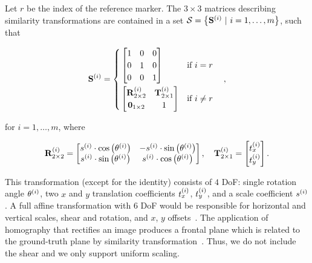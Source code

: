 Let $r$ be the index of the reference marker. The $3 \times 3$ matrices describing similarity transformations are contained in a set $\mathcal{S} = \left\{ {{\mathbf{S}}^{\left( {i} \right)} \ |\ i = 1, \dots, m} \right\}$, such that

\begin{equation}
    \label{eq:SimilarityMatrices}
    {\mathbf{S}}^{\left( {i} \right)} =
    \begin{cases}
        \begin{aligned}
             & \begin{bmatrix}
                1 & 0 & 0 \\
                0 & 1 & 0 \\
                0 & 0 & 1
            \end{bmatrix} & \text{if } i = r   \\
             & \begin{bmatrix}
                {\mathbf{R}}_{2 \times 2}^{\left( {i} \right)} & {\mathbf{T}}_{2 \times 1}^{\left( {i} \right)} \\
                \mathbf{0}_{1 \times 2}                  & 1
            \end{bmatrix} & \text{if }i \neq r \\
        \end{aligned}
    \end{cases},
\end{equation}

\noindent for $i = 1, \dots, m$, where

\begin{equation}
    {\mathbf{R}}_{2 \times 2}^{\left( {i} \right)} =
    \begin{bmatrix}
        {s}^{\left( {i} \right)} \cdot {\cos} \left( {\theta}^{\left( {i} \right)} \right) & -{s}^{\left( {i} \right)} \cdot {\sin} \left( {\theta}^{\left( {i} \right)} \right) \\
        {s}^{\left( {i} \right)} \cdot {\sin} \left( {\theta}^{\left( {i} \right)} \right) & {s}^{\left( {i} \right)} \cdot {\cos} \left( {\theta}^{\left( {i} \right)} \right)
    \end{bmatrix}, \quad
    {\mathbf{T}}_{2 \times 1}^{\left( {i} \right)} =
    \begin{bmatrix}
        {t}_{x}^{\left( {i} \right)} \\
        {t}_{y}^{\left( {i} \right)}
    \end{bmatrix}.
\end{equation}

\noindent This transformation (except for the identity) consists of $4$ DoF: single rotation angle ${\theta}^{\left( {i} \right)}$, two $x$ and $y$ translation coefficients ${t}_{x}^{\left( {i} \right)}$, ${t}_{y}^{\left( {i} \right)}$, and a scale coefficient ${s}^{\left( {i} \right)}$. A full affine transformation with $6$ DoF would be responsible for horizontal and vertical
scales, shear and rotation, and $x$, $y$ offsets~\cite{barath2016novel}. The application of homography that rectifies an image produces a frontal plane which is related to the ground-truth plane by similarity transformation~\cite{hartley2003multiple, beck2016planar}. Thus, we do not include the shear and we only support uniform scaling.


